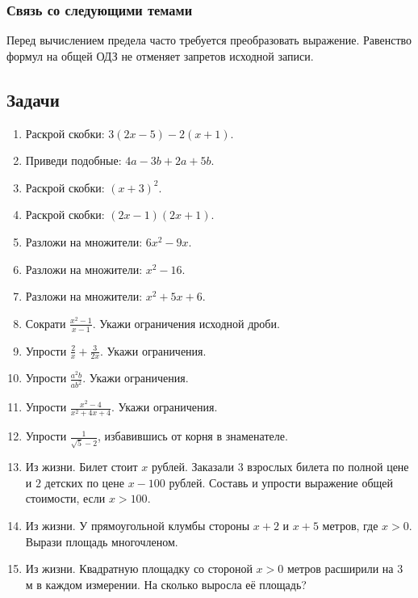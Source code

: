 \documentclass[12pt,a4paper]{article}
\theoremstyle{definition}
\theoremstyle{plain}
\theoremstyle{remark}
\begin{document}
\subsubsection*{Связь со следующими темами}
Перед вычислением предела часто требуется преобразовать выражение. Равенство формул на общей ОДЗ не отменяет запретов исходной записи.
\subsection*{Задачи}
\begin{enumerate}[label=\thesection.\arabic*.,leftmargin=2.8em,itemsep=12pt]
\item Раскрой скобки: \(3 (2 x - 5) - 2 (x + 1)\).
\item Приведи подобные: \(4 a - 3 b + 2 a + 5 b\).
\item Раскрой скобки: \((x + 3)^{2}\).
\item Раскрой скобки: \((2 x - 1) (2 x + 1)\).
\item Разложи на множители: \(6 x^{2} - 9 x\).
\item Разложи на множители: \(x^{2} - 16\).
\item Разложи на множители: \(x^{2} + 5 x + 6\).
\item Сократи \(\frac{x^{2} - 1}{x - 1}\). Укажи ограничения исходной дроби.
\item Упрости \(\frac{2}{x} + \frac{3}{2 x}\). Укажи ограничения.
\item Упрости \(\frac{a^{2} b}{ab^{2}}\). Укажи ограничения.
\item Упрости \(\frac{x^{2} - 4}{x^{2} + 4 x + 4}\). Укажи ограничения.
\item Упрости \(\frac{1}{\sqrt{5} - 2}\), избавившись от корня в знаменателе.
\item Из жизни. Билет стоит \(x\) рублей. Заказали \(3\) взрослых билета по полной цене и \(2\) детских по цене \(x - 100\) рублей. Составь и упрости выражение общей стоимости, если \(x > 100\).
\item Из жизни. У прямоугольной клумбы стороны \(x + 2\) и \(x + 5\) метров, где \(x > 0\). Вырази площадь многочленом.
\item Из жизни. Квадратную площадку со стороной \(x>0\) метров расширили на \(3\) м в каждом измерении. На сколько выросла её площадь?

\end{enumerate}
\end{document}
